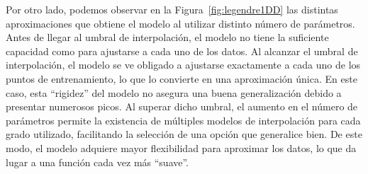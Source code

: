 Por otro lado, podemos observar en la Figura~\ref{fig:legendre1DD} las distintas aproximaciones que obtiene el modelo al utilizar distinto número de parámetros. Antes de llegar al umbral de interpolación, el modelo no tiene la suficiente capacidad como para ajustarse a cada uno de los datos. Al alcanzar el umbral de interpolación, el modelo se ve obligado a ajustarse exactamente a cada uno de los puntos de entrenamiento, lo que lo convierte en una aproximación única. En este caso, esta ``rigidez'' del modelo no asegura una buena generalización debido a presentar numerosos picos. Al superar dicho umbral, el aumento en el número de parámetros permite la existencia de múltiples modelos de interpolación para cada grado utilizado, facilitando la selección de una opción que generalice bien. De este modo, el modelo adquiere mayor flexibilidad para aproximar los datos, lo que da lugar a una función cada vez más ``suave''.\newline


